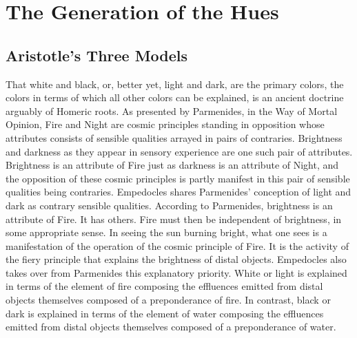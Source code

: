 \chapter{The Generation of the Hues} %
\label{cha:the_generation_of_the_hues}

\section{Aristotle's Three Models} %
\label{sec:aristotle_s_three_models}

That white and black, or, better yet, light and dark, are the primary colors, the colors in terms of which all other colors can be explained, is an ancient doctrine arguably of Homeric roots. As presented by Parmenides, in the Way of Mortal Opinion, Fire and Night are cosmic principles standing in opposition whose attributes consists of sensible qualities arrayed in pairs of contraries. Brightness and darkness as they appear in sensory experience are one such pair of attributes. Brightness is an attribute of Fire just as darkness is an attribute of Night, and the opposition of these cosmic principles is partly manifest in this pair of sensible qualities being contraries. Empedocles shares Parmenides' conception of light and dark as contrary sensible qualities. According to Parmenides, brightness is an attribute of Fire. It has others. Fire must then be independent of brightness, in some appropriate sense. In seeing the sun burning bright, what one sees is a manifestation of the operation of the cosmic principle of Fire. It is the activity of the fiery principle that explains the brightness of distal objects. Empedocles also takes over from Parmenides this explanatory priority. White or light is explained in terms of the element of fire composing the effluences emitted from distal objects themselves composed of a preponderance of fire. In contrast, black or dark is explained in terms of the element of water composing the effluences emitted from distal objects themselves composed of a preponderance of water. 

